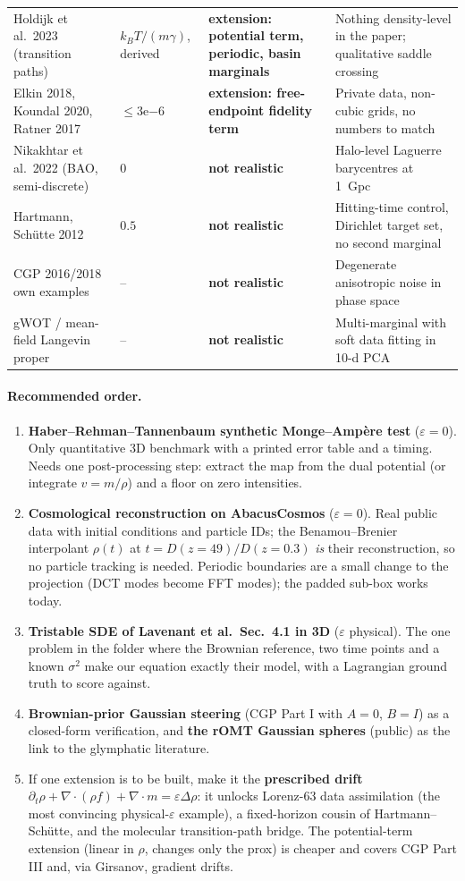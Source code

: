 \documentclass[11pt]{article}
\newcommand{\eps}{\varepsilon}
\newcommand{\dv}{\nabla\cdot}
\newcommand{\ext}[1]{\textcolor{BurntOrange}{\textbf{extension: #1}}}
\newcommand{\no}{\textcolor{BrickRed}{\textbf{not realistic}}}
\begin{document}
\begin{center}
\begin{tabular}{@{}p{4.2cm}p{1.6cm}p{3.0cm}p{5.6cm}@{}}
Holdijk et al.\ 2023 (transition paths) & $k_BT/(m\gamma)$, derived & \ext{potential term, periodic, basin marginals} & Nothing density-level in the paper; qualitative saddle crossing \\
Elkin 2018, Koundal 2020, Ratner 2017 & $\le 3$e$-6$ & \ext{free-endpoint fidelity term} & Private data, non-cubic grids, no numbers to match \\
\midrule
Nikakhtar et al.\ 2022 (BAO, semi-discrete) & $0$ & \no & Halo-level Laguerre barycentres at 1~Gpc \\
Hartmann, Sch\"utte 2012 & $0.5$ & \no & Hitting-time control, Dirichlet target set, no second marginal \\
CGP 2016/2018 own examples & -- & \no & Degenerate anisotropic noise in phase space \\
gWOT / mean-field Langevin proper & -- & \no & Multi-marginal with soft data fitting in 10-d PCA \\
\bottomrule
\end{tabular}
\end{center}

\paragraph{Recommended order.}
\begin{enumerate}[leftmargin=1.8em, itemsep=3pt]
  \item \textbf{Haber--Rehman--Tannenbaum synthetic Monge--Amp\`ere test} ($\eps=0$). Only quantitative 3D benchmark with a printed error table and a timing. Needs one post-processing step: extract the map from the dual potential (or integrate $v=m/\rho$) and a floor on zero intensities.
  \item \textbf{Cosmological reconstruction on AbacusCosmos} ($\eps=0$). Real public data with initial conditions and particle IDs; the Benamou--Brenier interpolant $\rho(t)$ at $t=D(z{=}49)/D(z{=}0.3)$ \emph{is} their reconstruction, so no particle tracking is needed. Periodic boundaries are a small change to the projection (DCT modes become FFT modes); the padded sub-box works today.
  \item \textbf{Tristable SDE of Lavenant et al.\ Sec.~4.1 in 3D} ($\eps$ physical). The one problem in the folder where the Brownian reference, two time points and a known $\sigma^2$ make our equation exactly their model, with a Lagrangian ground truth to score against.
  \item \textbf{Brownian-prior Gaussian steering} (CGP Part I with $A=0$, $B=I$) as a closed-form verification, and \textbf{the rOMT Gaussian spheres} (public) as the link to the glymphatic literature.
  \item If one extension is to be built, make it the \textbf{prescribed drift} $\partial_t\rho+\dv(\rho f)+\dv m=\eps\Delta\rho$: it unlocks Lorenz-63 data assimilation (the most convincing physical-$\eps$ example), a fixed-horizon cousin of Hartmann--Sch\"utte, and the molecular transition-path bridge. The potential-term extension (linear in $\rho$, changes only the prox) is cheaper and covers CGP Part III and, via Girsanov, gradient drifts.
\end{enumerate}
\end{document}
